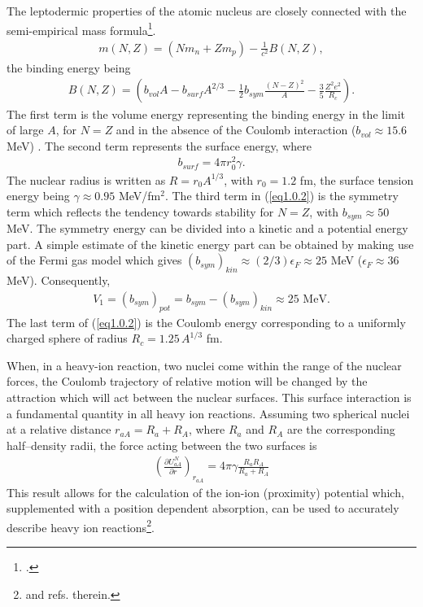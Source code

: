 The leptodermic properties of the atomic nucleus are closely connected with the semi-empirical mass formula\footnote{\cite{Weizsacker:35}.}.
\begin{align}
m(N,Z)=(Nm_n+Zm_p)-\frac{1}{c^2}B(N,Z),
\end{align}
the binding energy being
\begin{align}\label{eq1.0.2}
B(N,Z)=\left(b_{vol}A-b_{surf}A^{2/3}-\frac{1}{2} b_{sym}\frac{(N-Z)^2}{A}-\frac{3}{5}\frac{Z^2e^2}{R_c}\right).
\end{align}
The first term is the volume energy representing the binding energy in the limit of large $A$, for $N=Z$ and in the absence of the Coulomb interaction ($b_{vol}\approx15.6$ MeV) . The second term represents the surface energy, where
\begin{align}\label{eq1.0.3}
b_{surf}=4\pi r_0^2\gamma.
\end{align}
The nuclear radius is written as $R=r_0A^{1/3}$, with $r_0=1.2$ fm, the surface tension energy being $\gamma\approx 0.95$ MeV/fm$^2$. 
The third term in (\ref{eq1.0.2}) is the symmetry term which reflects the tendency towards stability for $N=Z$, with $b_{sym}\approx50$ MeV. The symmetry energy can be divided into a kinetic and a potential energy part. A simple estimate of the kinetic energy part can be obtained by making use of the Fermi gas model which gives $(b_{sym})_{kin}\approx(2/3)\epsilon_F\approx25$ MeV ($\epsilon_F\approx 36$ MeV). Consequently,
\begin{align}\label{eq1.0.4bis}
V_1=(b_{sym})_{pot}=b_{sym}-(b_{sym})_{kin}\approx 25\text{ MeV}.
\end{align}
The last term of (\ref{eq1.0.2}) is the Coulomb energy corresponding to a uniformly charged sphere of radius $R_c=1.25\,A^{1/3}$ fm.


When, in a heavy-ion reaction,  two nuclei come within the range of the nuclear forces, the Coulomb  trajectory of relative motion will be changed by the attraction which will act between the nuclear surfaces. This surface interaction is a fundamental quantity in all heavy ion reactions. Assuming two spherical nuclei at a relative distance $r_{aA}=R_a+R_A$, where $R_a$ and $R_A$ are the corresponding half--density radii, the force acting between the two surfaces is
\begin{align}\label{eq1.0.4}
\left(\frac{\partial U_{aA}^N}{\partial r}\right)_{r_{aA}}=4\pi \gamma\frac{R_aR_A}{R_a+R_A}
\end{align}
This result allows for the calculation of the ion-ion (proximity) potential which, supplemented with a position dependent absorption, can be used to accurately describe heavy ion reactions\footnote{\cite{Broglia:04a} and refs. therein.}.


